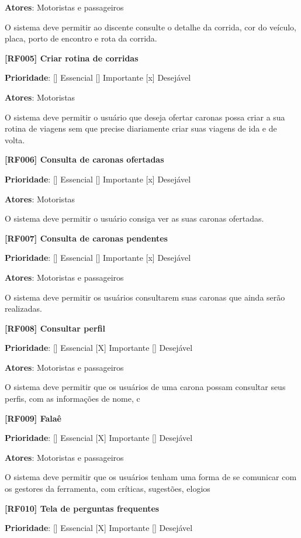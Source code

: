 \textbf{Atores}: Motoristas e passageiros

O sistema deve permitir ao discente consulte o detalhe da corrida, cor do veículo, placa, porto de encontro e rota da corrida.

\textbf{[RF005] Criar rotina de corridas}

\textbf{Prioridade}:      [] Essencial        [] Importante     [x] Desejável 

\textbf{Atores}: Motoristas

O sistema deve permitir o usuário que deseja ofertar caronas possa criar a sua rotina de viagens sem que precise diariamente criar suas viagens de ida e de volta.


\textbf{[RF006] Consulta de caronas ofertadas}

\textbf{Prioridade}:      [] Essencial        [] Importante     [x] Desejável 

\textbf{Atores}: Motoristas

O sistema deve permitir o usuário consiga ver as suas caronas ofertadas.


\textbf{[RF007] Consulta de caronas pendentes}

\textbf{Prioridade}:      [] Essencial        [] Importante     [x] Desejável 

\textbf{Atores}: Motoristas e passageiros

O sistema deve permitir os usuários consultarem suas caronas que ainda serão realizadas.


\textbf{[RF008] Consultar perfil}

\textbf{Prioridade}:      [] Essencial        [X] Importante     [] Desejável 

\textbf{Atores}: Motoristas e passageiros

O sistema deve permitir que os usuários de uma carona possam consultar seus perfis, com as informações de nome, c


\textbf{[RF009] Falaê}

\textbf{Prioridade}:      [] Essencial        [X] Importante     [] Desejável 

\textbf{Atores}: Motoristas e passageiros

O sistema deve permitir que os usuários tenham uma forma de se comunicar com os gestores da ferramenta, com críticas, sugestões, elogios

\textbf{[RF010]  Tela de perguntas frequentes}

\textbf{Prioridade}:      [] Essencial        [X] Importante     [] Desejável 

